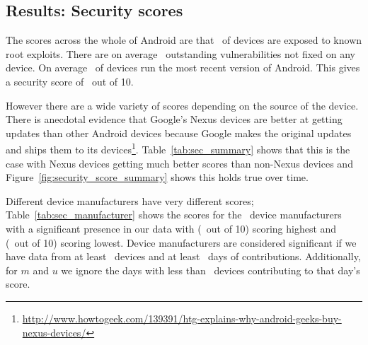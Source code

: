 \subsection{Results: Security scores}\label{sec:security_scoring:results}
The scores across the whole of Android are that \daMeanInsecurityPerc\ of devices are exposed to known root exploits.
There are on average \daMeanOutstandingVulnerabilities\ outstanding vulnerabilities not fixed on any device.
On average \daUpdatednessPerc\ of devices run the most recent version of Android.
This gives a security score of \daSecurityScore\ out of 10.

However there are a wide variety of scores depending on the source of the device.
There is anecdotal evidence that Google's Nexus devices are better at getting updates than other Android devices because Google makes the original updates and ships them to its devices\footnote{\url{http://www.howtogeek.com/139391/htg-explains-why-android-geeks-buy-nexus-devices/}}.
Table~\ref{tab:sec_summary} shows that this is the case with Nexus devices getting much better scores than non-Nexus devices and Figure~\ref{fig:security_score_summary} shows this holds true over time.

Different device manufacturers have very different scores; Table~\ref{tab:sec_manufacturer} shows the scores for the \daNumSigManufacturers\ device manufacturers with a significant presence in our data with \emph{\daSecScoreBestmanufacturer} (\daSecScoreBestmanufacturerScore\ out of 10) scoring highest and \emph{\daSecScoreWorstmanufacturer} (\daSecScoreWorstmanufacturerScore\ out of 10) scoring lowest.
Device manufacturers are considered significant if we have data from at least \daSigNumDevices\ devices and at least \daSigNumDeviceDays\ days of contributions.
Additionally, for $m$ and $u$ we ignore the days with less than \daSigNumDevicesDay\ devices contributing to that day's score.

\daTabSecScoressummary
\daTabSecScoresmanufacturer
\daTabSecScoresmodel
\daTabSecScoresoperator

